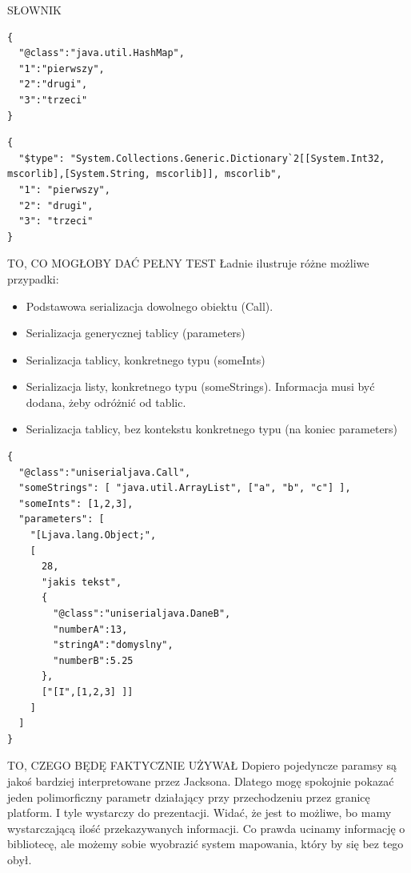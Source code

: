 SŁOWNIK
\begin{lstlisting}[float, frame=single, caption={Jackson daje. Słownik}, label=kod:jackson-dict-serilization]
{
  "@class":"java.util.HashMap",
  "1":"pierwszy",
  "2":"drugi",
  "3":"trzeci"
}
\end{lstlisting}


\begin{lstlisting}[float, frame=single, caption={JSON.NET daje. Słownik}, label=kod:json-net-dict-serilization]
{
  "$type": "System.Collections.Generic.Dictionary`2[[System.Int32, mscorlib],[System.String, mscorlib]], mscorlib",
  "1": "pierwszy",
  "2": "drugi",
  "3": "trzeci"
}
\end{lstlisting}

TO, CO MOGŁOBY DAĆ PEŁNY TEST
Ładnie ilustruje różne możliwe przypadki:
\begin{itemize}
	\item Podstawowa serializacja dowolnego obiektu (Call).
	\item Serializacja generycznej tablicy (parameters)
	\item Serializacja tablicy, konkretnego typu (someInts)
	\item Serializacja listy, konkretnego typu (someStrings). Informacja musi być dodana, żeby odróżnić od tablic.
	\item Serializacja tablicy, bez kontekstu konkretnego typu (na koniec parameters)
\end{itemize}

\begin{lstlisting}[float, frame=single, caption={Jackson daje. Faktyczny test wywołania.}, label=kod:jackson-call-serilization]
{
  "@class":"uniserialjava.Call",
  "someStrings": [ "java.util.ArrayList", ["a", "b", "c"] ],
  "someInts": [1,2,3],
  "parameters": [
    "[Ljava.lang.Object;",
    [
      28,
      "jakis tekst",
      {
        "@class":"uniserialjava.DaneB",
        "numberA":13,
        "stringA":"domyslny",
        "numberB":5.25
      },
      ["[I",[1,2,3] ]]
    ]
  ]
}
\end{lstlisting}

TO, CZEGO BĘDĘ FAKTYCZNIE UŻYWAŁ
Dopiero pojedyncze paramsy są jakoś bardziej interpretowane przez Jacksona. Dlatego mogę spokojnie pokazać jeden polimorficzny parametr działający przy przechodzeniu przez granicę platform. I tyle wystarczy do prezentacji. Widać, że jest to możliwe, bo mamy wystarczającą ilość przekazywanych informacji. Co prawda ucinamy informację o bibliotecę, ale możemy sobie wyobrazić system mapowania, który by się bez tego obył.

